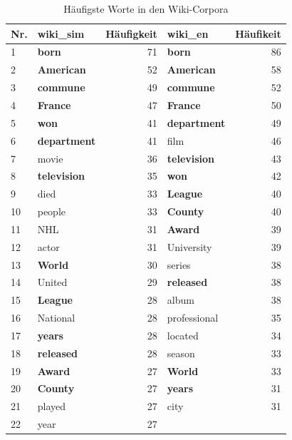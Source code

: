 \documentclass[11pt, a4paper]{article}
\begin{document}
\begin{table}[ht]
    \begin{tabular}{l*{2}{lr}}
    \toprule
    Nr. & wiki\_sim & Häufigkeit & wiki\_en & Häufikeit\\
    \midrule
     1 & \textbf{born}       & 71 & \textbf{born}         & 86\\
     2 & \textbf{American}   & 52 & \textbf{American}     & 58\\
     3 & \textbf{commune}    & 49 & \textbf{commune}      & 52\\
     4 & \textbf{France}     & 47 & \textbf{France}       & 50\\
     5 & \textbf{won}        & 41 & \textbf{department}   & 49\\
     6 & \textbf{department} & 41 & film                  & 46\\
     7 & movie               & 36 & \textbf{television}   & 43\\
     8 & \textbf{television} & 35 & \textbf{won}          & 42\\
     9 & died                & 33 & \textbf{League}       & 40\\
    10 & people              & 33 & \textbf{County}       & 40\\
    11 & NHL                 & 31 & \textbf{Award}        & 39\\
    12 & actor               & 31 & University            & 39\\
    13 & \textbf{World}      & 30 & series                & 38\\
    14 & United              & 29 & \textbf{released}     & 38\\
    15 & \textbf{League}     & 28 & album                 & 38\\
    16 & National            & 28 & professional          & 35\\
    17 & \textbf{years}      & 28 & located               & 34\\
    18 & \textbf{released}   & 28 & season                & 33\\
    19 & \textbf{Award}      & 27 & \textbf{World}        & 33\\
    20 & \textbf{County}     & 27 & \textbf{years}        & 31\\
    21 & played              & 27 & city                  & 31\\
    22 & year                & 27 &                       & \\
    \bottomrule
    \end{tabular}
    \caption{Häufigste Worte in den Wiki-Corpora}
    \label{words-wiki}
\end{table}
\end{document}
